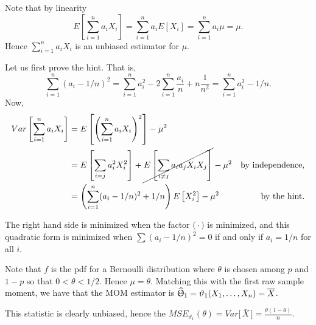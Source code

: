 \documentclass{stat_homework}
\begin{document}

\begin{solution}
  Note that by linearity
  $$
  E\left[\sum_{i=1}^na_i X_i \right] = \sum_{i=1}^n a_i E[X_i] = \sum_{i=1}^n a_i \mu = \mu.
  $$
  Hence $\sum_{i=1}^n a_i X_i$ is an unbiased estimator for $\mu$.
\end{solution}

\begin{solution}
  Let us first prove the hint. That is,
  $$
    \sum_{i=1}^n (a_i - 1/n)^2 = \sum_{i=1}^n a_i^2 - 2 \sum_{i=1}^n \frac{a_i}{n} + n \frac 1{n^2} = \sum_{i=1}^n a_i^2 - 1/n.
  $$
  Now,
  \begin{align*}
  Var\left[\sum_{i=1}^n a_i X_i\right] &= E\left[ \left(\sum_{i=1}^n a_i X_i\right)^2 \right] - \mu^2 \\
  &= E\left[\sum_{i=j} a_i^2 X_i^2\right] + \cancel{ E\left[\sum_{i\not=j} a_i a_j X_i X_j\right]} - \mu^2& \text {by independence,}\\
  &= \left(\sum_{i=1}^n(a_i-1/n)^2 + 1/n \right) E\left[X_i^2\right] - \mu^2& \text {by the hint.}
  \end{align*}

  The right hand side is minimized when the factor $\Big( \cdot \Big)$ is minimized, and this quadratic form is minimized when $\sum (a_i - 1/n)^2 = 0$ if and only if $a_i = 1/n$ for all $i$.
\end{solution}

\newpage



\begin{solution}
Note that $f$ is the pdf for a Bernoulli distribution where $\theta$ is chosen among $p$ and $1-p$ so that $0<\theta<1/2$.  Hence $\mu = \theta$.  Matching this with the first raw sample moment, we have that the MOM estimator is $\hat\Uptheta_1 =  \vartheta_1(X_1,\dots,X_n) = \bar X$.

This statistic is clearly unbiased, hence the $MSE_{\vartheta_1}(\theta) = Var\big[\,\bar X \,\big] = \frac{\theta(1-\theta)}{n}$.
\end{solution}
\end{document}
